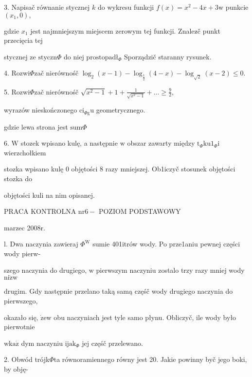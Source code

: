 \documentclass[a4paper,12pt]{article}
\begin{document}
3. Napisač równanie stycznej $k$ do wykresu funkcji $f(x)=x^{2}-4x+3\mathrm{w}$ punkcie $(x_{1},0),$

gdzie $x_{1}$ jest najmniejszym miejscem zerowym tej funkcji. Znalez$\acute{}$č punkt przecięcia tej

stycznej ze $\mathrm{s}\mathrm{t}\mathrm{y}\mathrm{c}\mathrm{z}\mathrm{n}\Phi$ do niej $\mathrm{p}\mathrm{r}\mathrm{o}\mathrm{s}\mathrm{t}\mathrm{o}\mathrm{p}\mathrm{a}\mathrm{d}\text{ł}_{\Phi}$ Sporządzič staranny rysunek.

4. Rozwi$\Phi$zač nierównośč $\log_{2}(x-1)-\log_{\frac{1}{2}}(4-x)-\log_{\sqrt{2}}(x-2)\leq 0.$

5. Rozwi$\Phi$zač nierównośč $\displaystyle \sqrt{x^{2}-1}+1+\frac{1}{\sqrt{x^{2}-1}}+\ldots\geq \displaystyle \frac{9}{2},$

wyrazów nieskończonego $\mathrm{c}\mathrm{i}_{\Phi \mathrm{g}}\mathrm{u}$ geometrycznego.

gdzie lewa strona jest $\mathrm{s}\mathrm{u}\mathrm{m}\Phi$

6. $\mathrm{W}$ stozek wpisano kulę, a następnie $\mathrm{w}$ obszar zawarty między $\mathrm{t}_{\Phi}\mathrm{k}\mathrm{u}1_{\Phi}\mathrm{i}$ wierzchołkiem

stozka wpisano kulę $0$ objętości 8 razy mniejszej. Ob1iczyč stosunek objętości stozka do

objętości kuli na nim opisanej.





PRACA KONTROLNA $\mathrm{n}\mathrm{r}6-$ POZIOM PODSTAWOWY

marzec 2008r.

l. Dwa naczynia zawieraj $\Phi^{\mathrm{W}}$ sumie 401itrów wody. Po prze1aniu pewnej części wody pierw-

szego naczynia do drugiego, $\mathrm{w}$ pierwszym naczyniu zostalo trzy razy mniej wody $\mathrm{n}\mathrm{i}\dot{\mathrm{z}}\mathrm{w}$

drugim. Gdy następnie przelano taką samą częśč wody drugiego naczynia do pierwszego,

okazało się, $\dot{\mathrm{z}}\mathrm{e}\mathrm{w}$ obu naczyniach jest tyle samo płynu. Obliczyč, ile wody było pierwotnie

$\mathrm{w}\mathrm{k}\mathrm{a}\dot{\mathrm{z}}$ dym naczyniu $\mathrm{i}\mathrm{j}\mathrm{a}\mathrm{k}_{\Phi}$ jej częśč przelewano.

2. Obwód trójk$\Phi$ta równoramiennego równy jest 20. Jakie powinny byč jego boki, by obję-
\end{document}
